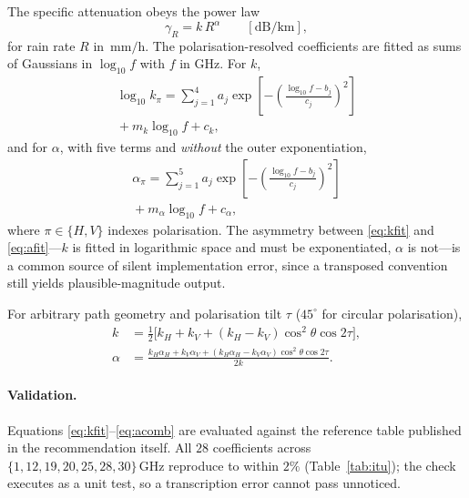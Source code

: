 \documentclass[10pt,twocolumn]{article}
\newcommand{\GHz}{\,\mathrm{GHz}}
\newcommand{\mmh}{\,\mathrm{mm/h}}
\begin{document}
The specific attenuation obeys the power law
\begin{equation}
\gamma_{R} = k\,R^{\alpha} \qquad [\mathrm{dB/km}],
\label{eq:powerlaw}
\end{equation}
for rain rate $R$ in $\mmh$. The polarisation-resolved coefficients are fitted as
sums of Gaussians in $\log_{10}f$ with $f$ in GHz. For $k$,
\begin{equation}
\begin{split}
\log_{10}k_{\pi} = \sum_{j=1}^{4} a_{j}
\exp\!\left[-\left(\frac{\log_{10}f-b_{j}}{c_{j}}\right)^{\!2}\right] \\
{}+ m_{k}\log_{10}f + c_{k},
\end{split}
\label{eq:kfit}
\end{equation}
and for $\alpha$, with five terms and \emph{without} the outer exponentiation,
\begin{equation}
\begin{split}
\alpha_{\pi} = \sum_{j=1}^{5} a_{j}
\exp\!\left[-\left(\frac{\log_{10}f-b_{j}}{c_{j}}\right)^{\!2}\right] \\
{}+ m_{\alpha}\log_{10}f + c_{\alpha},
\end{split}
\label{eq:afit}
\end{equation}
where $\pi\in\{H,V\}$ indexes polarisation. The asymmetry between
\eqref{eq:kfit} and \eqref{eq:afit}---$k$ is fitted in logarithmic space and
must be exponentiated, $\alpha$ is not---is a common source of silent
implementation error, since a transposed convention still yields
plausible-magnitude output.

For arbitrary path geometry and polarisation tilt $\tau$ ($45^{\circ}$ for
circular polarisation),
\begin{align}
k &= \tfrac{1}{2}\big[k_{H}+k_{V}+(k_{H}-k_{V})\cos^{2}\theta\cos 2\tau\big],
\label{eq:kcomb}\\
\alpha &= \frac{k_{H}\alpha_{H}+k_{V}\alpha_{V}
+(k_{H}\alpha_{H}-k_{V}\alpha_{V})\cos^{2}\theta\cos 2\tau}{2k}.
\label{eq:acomb}
\end{align}

\paragraph{Validation.} Equations \eqref{eq:kfit}--\eqref{eq:acomb} are evaluated
against the reference table published in the recommendation itself. All $28$
coefficients across $\{1,12,19,20,25,28,30\}\GHz$ reproduce to within $2\%$
(Table~\ref{tab:itu}); the check executes as a unit test, so a transcription
error cannot pass unnoticed.
\end{document}
